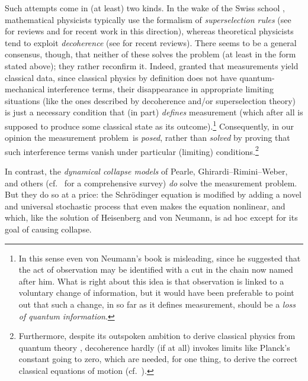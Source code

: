 \documentclass[12pt]{article}
\newcommand{\mmp}{measurement problem}
\begin{document}
 Such attempts come in (at least) two kinds. 
 In the wake of the Swiss school \cite{EWW, Hepp}, mathematical physicists typically use  the formalism of \emph{superselection rules} (see \cite{Landsman1991,KlaasObs} for reviews and \cite{Sewellrecent} for recent work in this direction), whereas theoretical physicists tend to exploit \emph{decoherence} (see \cite{Joos,Schloss} for recent reviews). 
There seems to be a general consensus, though, that neither of these solves the problem (at least in the form stated above); they rather reconfirm it. Indeed,  granted that measurements yield classical data,  since classical physics by definition  does not have quantum-mechanical interference terms, their disappearance in appropriate limiting situations (like the ones described by decoherence and/or superselection theory) 
 is just a necessary condition that (in part) \emph{defines} measurement (which after all is supposed  to produce some classical state as its outcome).\footnote{In this sense even von Neumann's book \cite{vN32} is misleading, since he suggested that the act of observation may be identified with a cut in the chain now named after him. What is right about this idea is that observation is linked to a voluntary change of information, but it would have been preferable to point out  that such a change, in so far as it defines measurement, should be a \emph{loss of quantum information}.} Consequently, in our opinion the \mmp\ is \emph{posed}, rather than  \emph{solved} by proving that such interference terms vanish under particular  (limiting) conditions.\footnote{Furthermore, despite its outspoken ambition to derive classical physics from quantum theory \cite{Joos,Schloss,Zurek1}, decoherence hardly (if at all) invokes limits like Planck's constant going to zero, which are needed, for one thing, to derive the correct classical equations of motion
 (cf.\ \cite{handbook,KlaasSchloss}). }

In contrast, the  \emph{dynamical collapse models} of Pearle, Ghirardi--Rimini--Weber,  and others (cf.\ \cite{BG} for a comprehensive survey) \emph{do} solve the measurement problem. But they do so at a price: the Schr\"{o}dinger equation is modified by adding a novel and universal stochastic process that even makes the equation nonlinear, and which, like the solution of Heisenberg and von Neumann, is  ad hoc except for its goal of causing collapse. 
\end{document}
